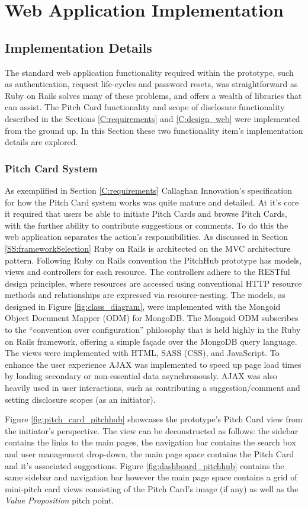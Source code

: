 \chapter{Web Application Implementation}

\section{Implementation Details}
The standard web application functionality required within the prototype, such as authentication, request life-cycles and password resets, was straightforward as Ruby on Rails solves many of these problems, and offers a wealth of libraries that can assist. The Pitch Card functionality and scope of disclosure functionality described in the Sections \ref{C:requirements} and \ref{C:design_web} were implemented from the ground up. In this Section these two functionality item's implementation details are explored.

\subsection{Pitch Card System}
As exemplified in Section \ref{C:requirements} Callaghan Innovation's specification for how the Pitch Card system works was quite mature and detailed. At it's core it required that users be able to initiate Pitch Cards and browse Pitch Cards, with the further ability to contribute suggestions or comments. To do this the web application separates the action's responsibilities. As discussed in Section \ref{SS:frameworkSelection} Ruby on Rails is architected on the MVC architecture pattern. Following Ruby on Rails convention the PitchHub prototype has models, views and controllers for each resource. The controllers adhere to the RESTful design principles, where resources are accessed using conventional HTTP resource methods and relationships are expressed via resource-nesting. The models, as designed in Figure \ref{fig:class_diagram}, were implemented with the Mongoid \cite{Mongo4:online} Object Document Mapper (ODM) for MongoDB. The Mongoid ODM subscribes to the ``convention over configuration'' philosophy that is held highly in the Ruby on Rails framework, offering a simple façade over the MongoDB query language. The views were implemented with HTML, SASS (CSS), and JavaScript. To enhance the user experience AJAX was implemented to speed up page load times by loading secondary or non-essential data asynchronously. AJAX was also heavily used in user interactions, such as contributing a suggestion/comment and setting disclosure scopes (as an initiator).
\par
Figure \ref{fig:pitch_card_pitchhub} showcases the prototype's Pitch Card view from the initiator's perspective. The view can be deconstructed as follows: the sidebar contains the links to the main pages, the navigation bar contains the search box and user management drop-down, the main page space contains the Pitch Card and it's associated suggestions. Figure \ref{fig:dashboard_pitchhub} contains the same sidebar and navigation bar however the main page space contains a grid of mini-pitch card views consisting of the Pitch Card's image (if any) as well as the \textit{Value Proposition} pitch point.

